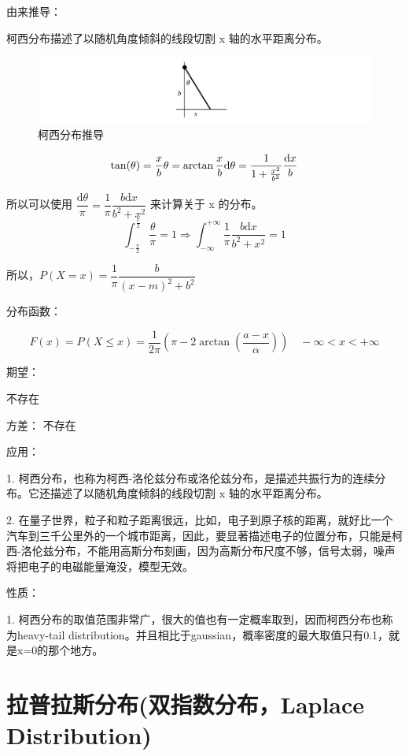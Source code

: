 \documentclass[12pt, a4paper, oneside]{ctexbook}
\begin{document}
 由来推导：

柯西分布描述了以随机角度倾斜的线段切割 x 轴的水平距离分布。

\begin{figure}[H]
  \centering
  \includegraphics[width=1\textwidth]{image/柯西分布推导.png}
  \caption{柯西分布推导}
  \label{fig:example}
\end{figure}
$$
\tan(\theta) = \dfrac{x}{b} \\
\theta = \arctan{\dfrac{x}{b}} \\
\mathrm{d}\theta = \dfrac{1}{1 + \frac{x^{2}}{b^{2}}} \dfrac{\mathrm{d}x}{b}
$$

所以可以使用 $\dfrac{\mathrm{d}\theta}{\pi} = \dfrac{1}{\pi} \dfrac{b\mathrm{d}x}{b^2 + x ^{2}}$ 来计算关于 x 的分布。
$$
\int_{-\frac{\pi}{2}}^{\frac{\pi}{2}} \dfrac{\theta}{\pi} = 1 \Rightarrow \int_{-\infty}^{+\infty} \dfrac{1}{\pi} \dfrac{b \mathrm{d}x}{b^2 + x^{2}} = 1
$$

所以，$P(X = x) = \dfrac{1}{\pi} \dfrac{b}{(x - m)^{2} + b^2}$

 分布函数：

$$
F(x) = P(X \leq x) = \dfrac{1}{2\pi}\left(\pi - 2\arctan(\dfrac{a - x}{\alpha})\right) \quad -\infty < x < +\infty
$$

 期望：

不存在

 方差：
不存在

 应用：

1.  柯西分布，也称为柯西-洛伦兹分布或洛伦兹分布，是描述共振行为的连续分布。它还描述了以随机角度倾斜的线段切割 x 轴的水平距离分布。

2. 在量子世界，粒子和粒子距离很远，比如，电子到原子核的距离，就好比一个汽车到三千公里外的一个城市距离，因此，要显著描述电子的位置分布，只能是柯西-洛伦兹分布，不能用高斯分布刻画，因为高斯分布尺度不够，信号太弱，噪声将把电子的电磁能量淹没，模型无效。

 性质：

1.  柯西分布的取值范围非常广，很大的值也有一定概率取到，因而柯西分布也称为heavy-tail distribution。并且相比于gaussian，概率密度的最大取值只有0.1，就是x=0的那个地方。


\section{拉普拉斯分布(双指数分布，Laplace Distribution)}
\end{document}
